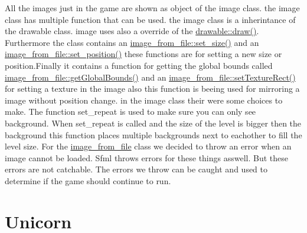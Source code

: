 All the images just in the game are shown as object of the image class. the image class has multiple function that can be used. the image class is a inherintance of the drawable class. image uses also a override of the \hyperlink{classdrawable_a4e49e2c1121704c83ce24c5f48dd910f}{drawable\+::draw()}. Furthermore the class contains an \hyperlink{classimage__from__file_a43b0d6b11bf46827308e4e6cb7aa8579}{image\+\_\+from\+\_\+file\+::set\+\_\+size()} and an \hyperlink{classimage__from__file_a868911f8d541af91290fb8dc56435cd2}{image\+\_\+from\+\_\+file\+::set\+\_\+position()} these functions are for setting a new size or position.\+Finally it contains a function for getting the global bounds called \hyperlink{classimage__from__file_a971a591f906fa5c6e85b4e32cfc3d6a0}{image\+\_\+from\+\_\+file\+::get\+Global\+Bounds()} and an \hyperlink{classimage__from__file_a6561a7e8833e4ca84ba5a31e98802757}{image\+\_\+from\+\_\+file\+::set\+Texture\+Rect()} for setting a texture in the image also this function is beeing used for mirroring a image without position change. in the image class their were some choices to make. The function set\+\_\+repeat is used to make sure you can only see background. When set\+\_\+repeat is called and the size of the level is bigger then the background this function places multiple backgrounds next to eachother to fill the level size. For the \hyperlink{classimage__from__file}{image\+\_\+from\+\_\+file} class we decided to throw an error when an image cannot be loaded. Sfml throws errors for these things asswell. But these errors are not catchable. The errors we throw can be caught and used to determine if the game should continue to run.\hypertarget{index_unicorn}{}\section{Unicorn}\label{index_unicorn}
